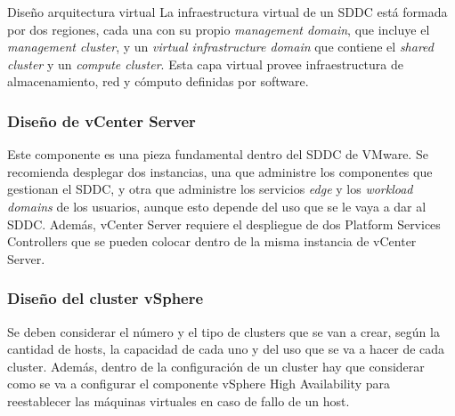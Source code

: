 \begin{subsection}{Diseño arquitectura virtual}
La infraestructura virtual de un SDDC está formada por dos regiones, cada una con su propio \textit{management domain}, que incluye el \textit{management cluster}, y un \textit{virtual infrastructure domain} que contiene el \textit{shared cluster} y un \textit{compute cluster}. Esta capa virtual provee infraestructura de almacenamiento, red y cómputo definidas por software.

\subsubsection{Diseño de vCenter Server}
Este componente es una pieza fundamental dentro del SDDC de VMware. Se recomienda desplegar dos instancias, una que administre los componentes que gestionan el SDDC, y otra que administre los servicios \textit{edge} y los \textit{workload domains} de los usuarios, aunque esto depende del uso que se le vaya a dar al SDDC. Además, vCenter Server requiere el despliegue de dos Platform Services Controllers que se pueden colocar dentro de la misma instancia de vCenter Server.

\subsubsection{Diseño del cluster vSphere}
Se deben considerar el número y el tipo de clusters que se van a crear, según la cantidad de hosts, la capacidad de cada uno y del uso que se va a hacer de cada cluster. Además, dentro de la configuración de un cluster hay que considerar como se va a configurar el componente vSphere High Availability para reestablecer las máquinas virtuales en caso de fallo de un host.


\end{subsection}
